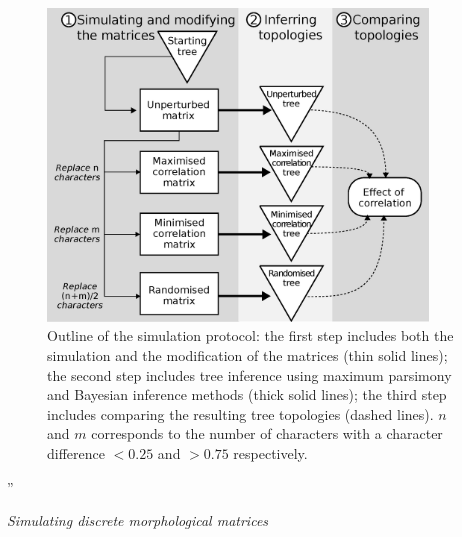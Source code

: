 \documentclass[12pt,letterpaper]{article}
\renewcommand{\subsection}[1]{%
\bigskip
\begin{center}
\begin{large}
\normalfont\itshape #1
\end{large}
\end{center}}
\begin{document}
\begin{figure}[!htbp]
\centering
   \includegraphics[width=0.9\textwidth]{outline.eps}
\caption{Outline of the simulation protocol: the first step includes both the simulation and the modification of the matrices (thin solid lines); the second step includes tree inference using maximum parsimony and Bayesian inference methods (thick solid lines); the third step includes comparing the resulting tree topologies (dashed lines). $n$ and $m$ corresponds to the number of characters with a character difference $<0.25$ and $>0.75$ respectively.}
\label{Fig:outline}
\end{figure}
''
\subsection{Simulating discrete morphological matrices}
\end{document}
